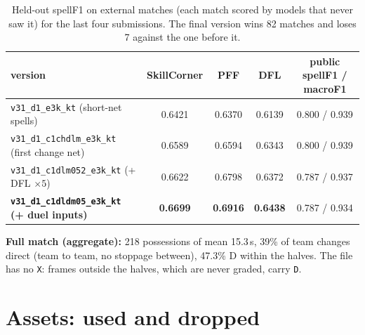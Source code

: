 \documentclass[10pt,a4paper]{article}
\newcommand{\code}[1]{\texttt{\small #1}}
\newcommand{\sF}{spellF1}
\newcommand{\mF}{macroF1}
\begin{document}
\begin{table}[!htbp]
\centering\small
\begin{tabular}{@{}lcccc@{}}
\toprule
version & SkillCorner & PFF & DFL & public \sF{} / \mF \\
\midrule
\code{v31\_d1\_e3k\_kt} (short-net spells)          & 0.6421 & 0.6370 & 0.6139 & 0.800 / 0.939 \\
\code{v31\_d1\_c1chdlm\_e3k\_kt} (first change net) & 0.6589 & 0.6594 & 0.6343 & 0.800 / 0.939 \\
\code{v31\_d1\_c1dlm052\_e3k\_kt} (+ DFL $\times5$) & 0.6622 & 0.6798 & 0.6372 & 0.787 / 0.937 \\
\textbf{\code{v31\_d1\_c1dldm05\_e3k\_kt} (+ duel inputs)} & \textbf{0.6699} & \textbf{0.6916} & \textbf{0.6438} & 0.787 / 0.934 \\
\bottomrule
\end{tabular}
\caption{Held-out \sF{} on external matches (each match scored by models that never saw it) for
the last four submissions. The final version wins 82 matches and loses 7 against the one before it.}
\label{tab:external}
\end{table}

\textbf{Full match (aggregate):} 218 possessions of mean 15.3\,s, 39\% of team changes direct
(team to team, no stoppage between), 47.3\% D within the halves. The file has no \code{X}: frames
outside the halves, which are never graded, carry \code{D}.

\section{Assets: used and dropped}
\end{document}
